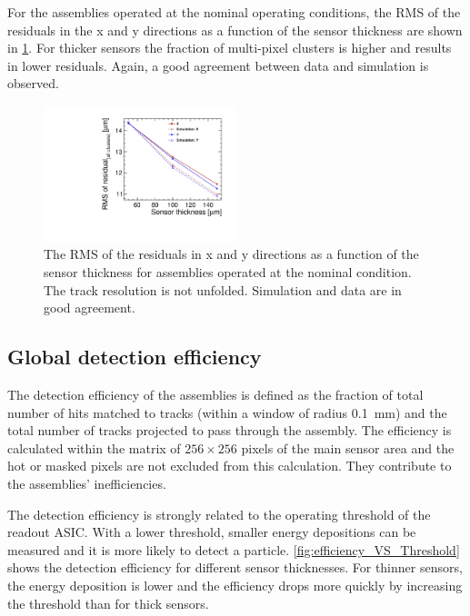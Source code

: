 For the assemblies operated at the nominal operating conditions, the
RMS of the residuals in the x and y directions as a function of the
sensor thickness are shown in \cref{fig:residuals_thickness}. For
thicker sensors the fraction of multi-pixel clusters is higher and
results in lower residuals. Again, a good agreement between data and
simulation is observed.

\begin{figure}[htbp] 
  \centering
  \includegraphics[width=0.5\textwidth]{./figures/TestBeam/residuals_vs_thickness.pdf}
  \caption{The RMS of the residuals in x and y directions as a
    function of the sensor thickness for assemblies operated at the
    nominal condition. The track resolution is not
    unfolded. Simulation and data are in good agreement.}
  \label{fig:residuals_thickness}
\end{figure}



\subsection{Global detection efficiency}

The detection efficiency of the assemblies is defined as the fraction
of total number of hits matched to tracks (within a window of radius
0.1~mm) and the total number of tracks projected to pass through the
assembly. The efficiency is calculated within the matrix of
$256\times256$ pixels of the main sensor area and the hot or masked
pixels are not excluded from this calculation. They contribute to the
assemblies' inefficiencies.

The detection efficiency is strongly related to the operating
threshold of the readout ASIC. With a lower threshold, smaller energy
depositions can be measured and it is more likely to detect a
particle. \cref{fig:efficiency_VS_Threshold} shows the detection
efficiency for different sensor thicknesses. For thinner sensors, the
energy deposition is lower and the efficiency drops more quickly by
increasing the threshold than for thick sensors.

